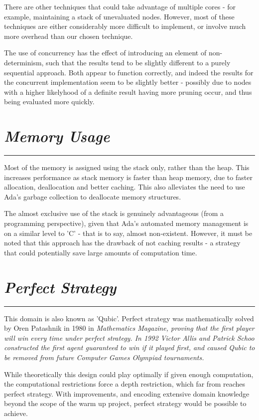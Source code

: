 \documentclass[10pt]{report}
\begin{document}
\begin{multicols}{2}
There are other techniques that could take advantage of multiple cores - for example, maintaining a stack of unevaluated nodes. However, most of these techniques are either considerably more difficult to implement, or involve much more overhead than our chosen technique.

The use of concurrency has the effect of introducing an element of non-determinism, such that the results tend to be slightly different to a purely sequential approach. Both appear to function correctly, and indeed the results for the concurrent implementation seem to be slightly better - possibly due to nodes with a higher likelyhood of a definite result having more pruning occur, and thus being evaluated more quickly.

\section*{\emph{\textmd{Memory Usage}}}
\hrule
\vspace{0.4cm}

Most of the memory is assigned using the stack only, rather than the heap. This increases performance as stack memory is faster than heap memory, due to faster allocation, deallocation and better caching. This also alleviates the need to use Ada's garbage collection to deallocate memory structures. 

The almost exclusive use of the stack is genuinely advantageous (from a programming perspective), given that Ada's automated memory management is on a similar level to 'C' - that is to say, almost non-existent. However, it must be noted that this approach has the drawback of not caching results - a strategy that could potentially save large amounts of computation time.

\section*{\emph{{Perfect Strategy}}}
\hrule
\vspace{0.4cm}

This domain is also known as 'Qubic'. Perfect strategy was mathematically solved by Oren Patashnik in 1980 in \em Mathematics Magazine\em, proving that the first player will win every time under perfect strategy. In 1992 Victor Allis and Patrick Schoo constructed the first agent guaranteed to win if it played first, and caused Qubic to be removed from future Computer Games Olympiad tournaments.

While theoretically this design could play optimally if given enough computation, the computational restrictions force a depth restriction, which  far from reaches perfect strategy. With improvements, and encoding extensive domain knowledge beyond the scope of the warm up project, perfect strategy would be possible to achieve.


\end{multicols}
\end{document}
